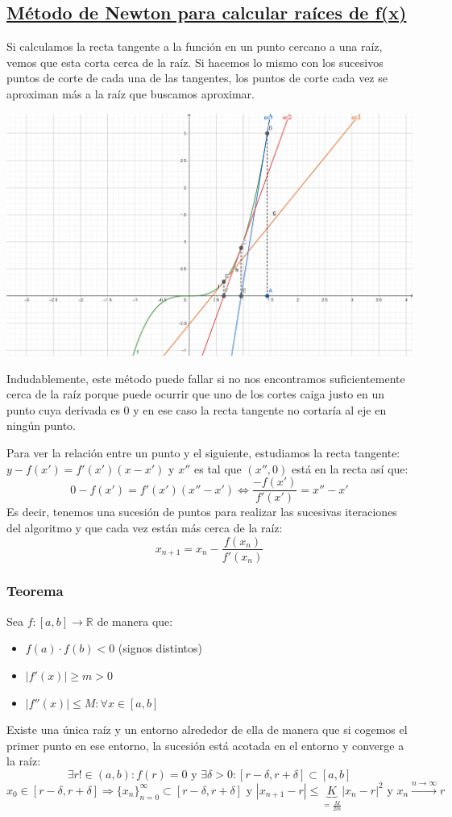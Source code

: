 \documentclass[10pt,a4paper,openright]{book}
\begin{document}
\subsection*{\underline{Método de Newton para calcular raíces de f(x)}}
Si calculamos la recta tangente a la función en un punto cercano a una raíz, vemos que esta corta cerca de la raíz. Si hacemos lo mismo con los sucesivos puntos de corte de cada una de las tangentes, los puntos de corte cada vez se aproximan más a la raíz que buscamos aproximar.
\begin{center}
\includegraphics[scale=1.6]{metodo Newton}
\end{center}
Indudablemente, este método puede fallar si no nos encontramos suficientemente cerca de la raíz porque puede ocurrir que uno de los cortes caiga justo en un punto cuya derivada es 0 y en ese caso la recta tangente no cortaría al eje en ningún punto.

Para ver la relación entre un punto y el siguiente, estudiamos la recta tangente: $y-f(x')=f'(x')(x-x')$ y $x''$ es tal que $(x'', 0)$ está en la recta así que:
$$0-f(x')=f'(x')(x''-x')\Leftrightarrow \frac{-f(x')}{f'(x')}=x''-x'$$
Es decir, tenemos una sucesión de puntos para realizar las sucesivas iteraciones del algoritmo y que cada vez están más cerca de la raíz:
$$x_{n+1}=x_n-\frac{f(x_n)}{f'(x_n)}$$

\subsubsection*{Teorema}
Sea $f: [a,b]\rightarrow \mathbb R$ de manera que:
\begin{itemize}
\item $f(a)\cdot f(b)<0$ (signos distintos)
\item $|f'(x)|\geq m>0$
\item $|f''(x)|\leq M: \forall x\in [a,b]$
\end{itemize}
Existe una única raíz y un entorno alrededor de ella de manera que si cogemos el primer punto en ese entorno, la sucesión está acotada en el entorno y converge a la raíz:
$$\exists r!\in (a,b):f(r)=0\mbox{ y } \exists \delta > 0 : [r-\delta, r+\delta]\subset [a,b]$$
$$x_0\in [r-\delta, r+\delta]\Rightarrow \{x_n\}_{n=0}^\infty \subset [r-\delta, r+\delta]\mbox{ y }|x_{n+1}-r|\leq \underbrace{K}_{=\frac{M}{2m}}|x_n-r|^2\mbox{ y }x_n\xrightarrow{n\rightarrow \infty}r$$
\end{document}
